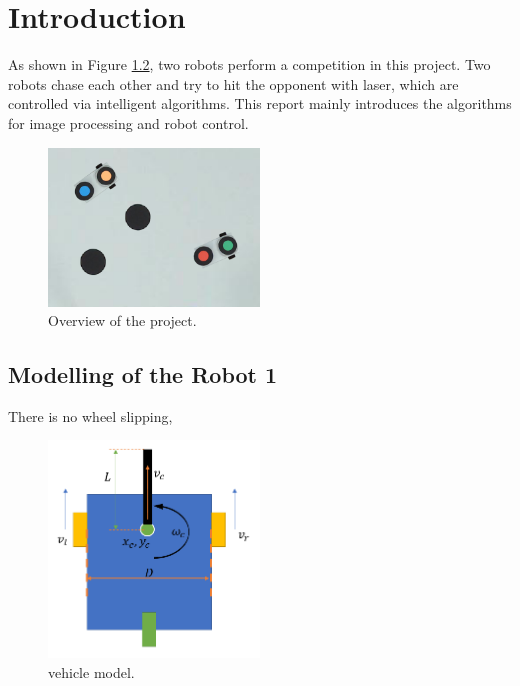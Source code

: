\chapter{Introduction}
\renewcommand{\thepage}{\arabic{page}}
\setcounter{page}{1}

As shown in Figure \ref{intro}, two robots perform a competition in this project. Two robots chase each other and try to hit the opponent with laser, which are controlled via intelligent algorithms. This report mainly introduces the algorithms for image processing and robot control.

\begin{figure}[thb]
    \centering
    \includegraphics[width=0.5\textwidth]{images/intro.png}
    \caption[Overview of the project]{Overview of the project.}
    \label{intro}
\end{figure}

\section{Modelling of the Robot 1}\label{robot_modelling}

There is no wheel slipping, 

\begin{figure}[thb]
    \centering
    \includegraphics[width=0.5\textwidth]{images/vehicle_model.png}
    \caption[vehicle model]{vehicle model.}\label{intro}
\end{figure}


